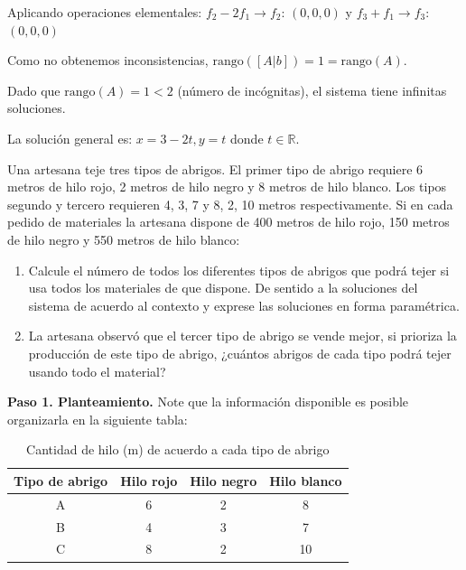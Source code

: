 \begin{prob}
\begin{enumerate}[$a)$]
\begin{myproof}
Aplicando operaciones elementales: $f_2 - 2f_1 \rightarrow f_2$: $(0, 0, 0)$ y $f_3 + f_1 \rightarrow f_3$: $(0, 0, 0)$

Como no obtenemos inconsistencias, $\text{rango}([A|b]) = 1 = \text{rango}(A)$.

Dado que $\text{rango}(A) = 1 < 2$ (número de incógnitas), el sistema tiene infinitas soluciones.

La solución general es: $x = 3 - 2t, y = t$ donde $t \in \mathbb{R}$.
\end{myproof}

\end{enumerate}
\end{prob}

\begin{prob} 
Una artesana teje tres tipos de abrigos. El primer tipo de abrigo requiere 6 metros de hilo rojo, 2 metros de hilo negro y 8 metros de hilo blanco. Los tipos segundo y tercero requieren 4, 3, 7 y 8, 2, 10 metros respectivamente. Si en cada pedido de materiales la artesana dispone de 400 metros de hilo rojo, 150 metros de hilo negro y 550 metros de hilo blanco: 

\begin{enumerate}[$(a)$]
\item Calcule el número de todos los diferentes tipos de abrigos que podrá tejer si usa todos los materiales de que dispone. De sentido a la soluciones del sistema de acuerdo al contexto y exprese las soluciones en forma paramétrica.
 \item La artesana observó que el tercer tipo de abrigo se vende mejor, si prioriza la producción de este tipo de abrigo, ¿cuántos abrigos de cada tipo podrá tejer usando todo el material?
 \end{enumerate} 

\begin{myproof}
\textbf{Paso 1. Planteamiento.} Note que la información disponible es posible organizarla en la siguiente tabla:

\begin{table}[H]
\centering
\begin{tabular}{|c|c|c|c|} \hline Tipo de abrigo&Hilo rojo&Hilo negro&Hilo blanco\\\hline
A&6&2&8\\\hline
B&4&3&7\\\hline
C&8&2&10\\\hline
\end{tabular}
\caption{Cantidad de hilo (m) de acuerdo a cada tipo de abrigo}
\end{table}


\end{myproof}
\end{prob}

